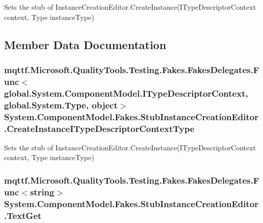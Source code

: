 Sets the stub of Instance\-Creation\-Editor.\-Create\-Instance(\-I\-Type\-Descriptor\-Context context, Type instance\-Type)



\subsection{Member Data Documentation}
\hypertarget{class_system_1_1_component_model_1_1_fakes_1_1_stub_instance_creation_editor_a32b6ac18756c25e35871bce24707d354}{
\subsubsection[{Create\-Instance\-I\-Type\-Descriptor\-Context\-Type}]{\setlength{\rightskip}{0pt plus 5cm}mqttf.\-Microsoft.\-Quality\-Tools.\-Testing.\-Fakes.\-Fakes\-Delegates.\-Func$<$global.\-System.\-Component\-Model.\-I\-Type\-Descriptor\-Context, global.\-System.\-Type, object$>$ System.\-Component\-Model.\-Fakes.\-Stub\-Instance\-Creation\-Editor.\-Create\-Instance\-I\-Type\-Descriptor\-Context\-Type}}\label{class_system_1_1_component_model_1_1_fakes_1_1_stub_instance_creation_editor_a32b6ac18756c25e35871bce24707d354}


Sets the stub of Instance\-Creation\-Editor.\-Create\-Instance(\-I\-Type\-Descriptor\-Context context, Type instance\-Type)

\hypertarget{class_system_1_1_component_model_1_1_fakes_1_1_stub_instance_creation_editor_a5152a77595c77734d38708e121aae69e}{
\subsubsection[{Text\-Get}]{\setlength{\rightskip}{0pt plus 5cm}mqttf.\-Microsoft.\-Quality\-Tools.\-Testing.\-Fakes.\-Fakes\-Delegates.\-Func$<$string$>$ System.\-Component\-Model.\-Fakes.\-Stub\-Instance\-Creation\-Editor.\-Text\-Get}}\label{class_system_1_1_component_model_1_1_fakes_1_1_stub_instance_creation_editor_a5152a77595c77734d38708e121aae69e}


